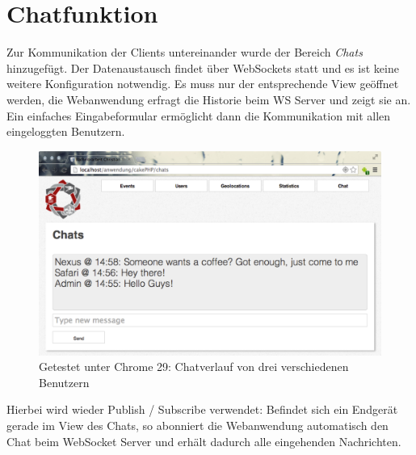 \section{Chatfunktion}
Zur Kommunikation der Clients untereinander wurde der Bereich \emph{Chats} hinzugefügt. Der Datenaustausch findet über WebSockets statt und es ist keine weitere Konfiguration notwendig. Es muss nur der entsprechende View geöffnet werden, die Webanwendung erfragt die Historie beim WS Server und zeigt sie an. Ein einfaches Eingabeformular ermöglicht dann die Kommunikation mit allen eingeloggten Benutzern.

\begin{figure}[!ht]
	\centering
	\includegraphics[width=15cm]{fig/screenshot_chat}
	\caption[Beispielansicht der Chats]{Getestet unter Chrome 29: Chatverlauf von drei verschiedenen Benutzern}
\end{figure}

Hierbei wird wieder Publish / Subscribe verwendet: Befindet sich ein Endgerät gerade im View des Chats, so abonniert die Webanwendung automatisch den Chat beim WebSocket Server und erhält dadurch alle eingehenden Nachrichten.

